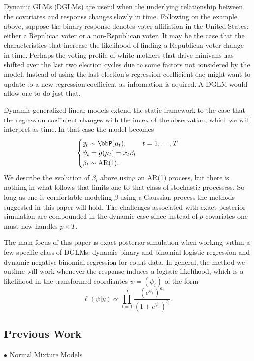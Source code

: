 \documentclass[11pt]{article}
\newcommand{\point}{\noindent $\bullet$ }
\begin{document}
Dynamic GLMs (DGLMs) are useful when the underlying relationship between the
covariates and response changes slowly in time.  Following on the example above,
suppose the binary response denotes voter affiliation in the United States:
either a Repulican voter or a non-Republican voter.  It may be the case that the
characteristics that increase the likelihood of finding a Republican voter
change in time.  Perhaps the voting profile of white mothers that drive minivans
has shifted over the last two election cycles due to some factors not considered
by the model.  Instead of using the last election's regression coefficient one
might want to update to a new regression coefficient as information is aquired.
A DGLM would allow one to do just that.

Dynamic generalized linear models extend the static framework to the case that
the regression coefficient changes with the index of the observation, which we
will interpret as time.  In that case the model becomes
\[
\begin{cases}
  y_t \sim \bbP(\mu_t), & t=1, \ldots, T \\
  \psi_t = g(\mu_t) = x_t \beta_t \\
  \beta_t \sim \text{AR}(1).
\end{cases}
\]
We describe the evolution of $\beta_t$ above using an AR(1) process, but there
is nothing in what follows that limits one to that class of stochastic
processess.  So long as one is comfortable modeling $\beta$ using a Gaussian
process the methods suggested in this paper will hold.  The challenges
associated with exact posterior simulation are compounded in the dynamic case
since instead of $p$ covariates one must now handles $p \times T$.  

The main focus of this paper is exact posterior simulation when working within a
few specific class of DGLMs: dynamic binary and binomial logistic regression and
dynamic negative binomial regression for count data.  In general, the method we
outline will work whenever the response induces a logistic likelihood, which is
a likelihood in the transformed coordiantes $\psi = (\psi_i)$ of the form
\[
\ell(\psi | y) \propto \prod_{t=1}^T
\frac{(e^{\psi_i})^{a_i}}{(1+e^{\psi_i})^{b_i}}.
\]

\subsection{Previous Work}

\point Normal Mixture Models
\end{document}

